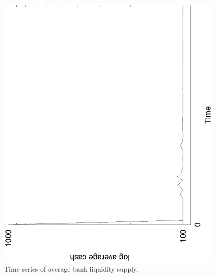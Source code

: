 \begin{figure}[htb]
 \begin{center}
\includegraphics[angle=-90]{data-bankave.eps}
 \caption{Time series of average bank liquidity supply.}
 \label{fig:data-bankave}
   \end{center}
\end{figure}
